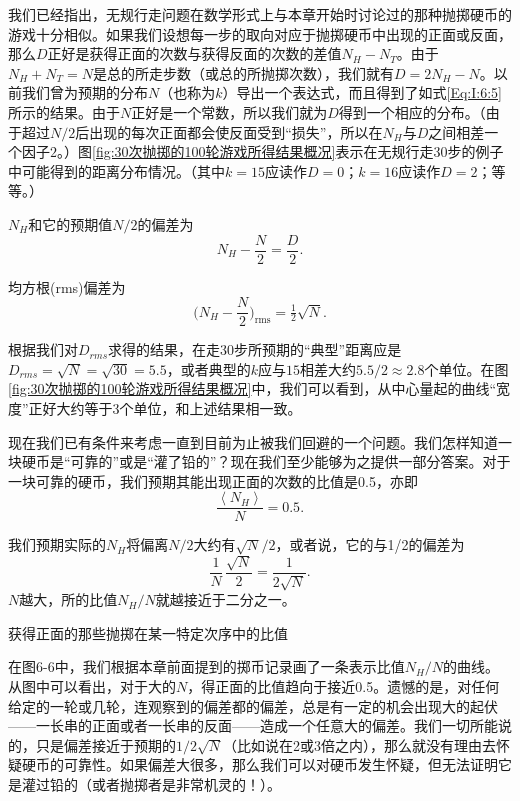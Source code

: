 \documentclass[12pt,oneside]{book}
\begin{document}
我们已经指出，无规行走问题在数学形式上与本章开始时讨论过的那种抛掷硬币的游戏十分相似。如果我们设想每一步的取向对应于抛掷硬币中出现的正面或反面，那么$D$正好是获得正面的次数与获得反面的次数的差值$N_H-N_T$。由于$N_H+N_T=N$是总的所走步数（或总的所抛掷次数），我们就有$D=2N_H-N$。以前我们曾为预期的分布$N$（也称为$k$）导出一个表达式，而且得到了如式\eqref{Eq:I:6:5}所示的结果。由于$N$正好是一个常数，所以我们就为$D$得到一个相应的分布。（由于超过$N/2$后出现的每次正面都会使反面受到“损失”，所以在$N_H$与$D$之间相差一个因子$2$。）图\ref{fig:30次抛掷的100轮游戏所得结果概况}表示在无规行走30步的例子中可能得到的距离分布情况。（其中$k=15$应读作$D=0$；$k=16$应读作$D=2$；等等。）

$N_H$和它的预期值$N/2$的偏差为
\begin{equation}
\label{Eq:I:6:11}
N_H-\frac{N}{2}=\frac{D}{2}.
\end{equation}

均方根(rms)偏差为
\begin{equation}
\label{Eq:I:6:12}
\biggl(N_H-\frac{N}{2}\biggr)_{\text{rms}}=\tfrac{1}{2}\sqrt{N}.
\end{equation}

根据我们对$D_{rms}$求得的结果，在走30步所预期的“典型”距离应是$D_{rms}=\sqrt{N}=\sqrt{30}=5.5$，或者典型的$k$应与$15$相差大约$5.5/2 \approx 2.8$个单位。在图\ref{fig:30次抛掷的100轮游戏所得结果概况}中，我们可以看到，从中心量起的曲线“宽度”正好大约等于3个单位，和上述结果相一致。

现在我们已有条件来考虑一直到目前为止被我们回避的一个问题。我们怎样知道一块硬币是“可靠的”或是“灌了铅的”？现在我们至少能够为之提供一部分答案。对于一块可靠的硬币，我们预期其能出现正面的次数的比值是0.5，亦即
\begin{equation}
\label{Eq:I:6:13}
\frac{\left < N_H \right > }{N}=0.5.
\end{equation}

我们预期实际的$N_H$将偏离$N/2$大约有$\sqrt{N}/2$，或者说，它的与1/2的偏差为
\begin{equation*}
\frac{1}{N}\,\frac{\sqrt{N}}{2}=\frac{1}{2\sqrt{N}}.
\end{equation*}
$N$越大，所的比值$N_H/N$就越接近于二分之一。

\begin{fig}{获得正面的那些抛掷在某一特定次序中的比值}
\caption{获得正面的那些抛掷在某一特定次序中的比值}
\label{fig:获得正面的那些抛掷在某一特定次序中的比值}
\end{fig}
在图6-6中，我们根据本章前面提到的掷币记录画了一条表示比值$N_H/N$的曲线。从图中可以看出，对于大的$N$，得正面的比值趋向于接近0.5。遗憾的是，对任何给定的一轮或几轮，连观察到的偏差都的偏差，总是有一定的机会出现大的起伏——一长串的正面或者一长串的反面——造成一个任意大的偏差。我们一切所能说的，只是偏差接近于预期的$1/2\sqrt{N}$（比如说在2或3倍之内），那么就没有理由去怀疑硬币的可靠性。如果偏差大很多，那么我们可以对硬币发生怀疑，但无法证明它是灌过铅的（或者抛掷者是非常机灵的！）。
\end{document}
